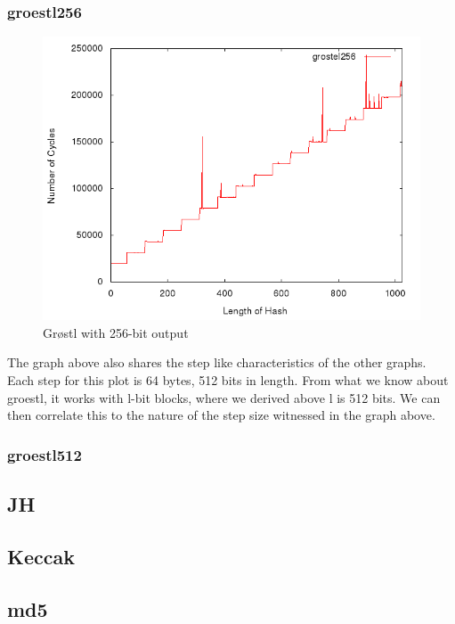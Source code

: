 \documentclass[10pt,a4paper]{article}
\begin{document}
\subsubsection{groestl256}
    \begin{figure}[H]
        \begin{center}
            \includegraphics[scale=0.5]{images/grostel256.png} 
            \caption{Gr{\o}stl with 256-bit output}
        \end{center}
    \end{figure}
The graph above also shares the step like characteristics of the other graphs. Each step for this plot is 64 bytes, 512 bits in length. From what we know about groestl, it works with l-bit blocks, where we derived above l is 512 bits. We can then correlate this to the nature of the step size witnessed in the graph above.


\subsubsection{groestl512}
\subsection{JH}

\subsection{Keccak}


\subsection{md5}
\end{document}
